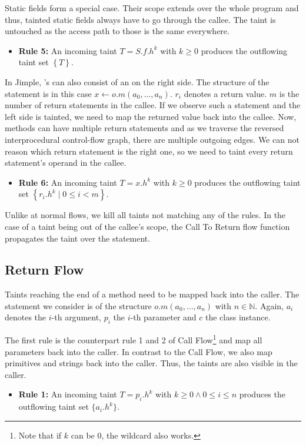 \documentclass[../draft.tex]{subfiles}
\begin{document}
    Static fields form a special case. Their scope extends over the whole program and thus, tainted static fields always have to go through the callee. The taint is untouched as the access path to those is the same everywhere.
    \begin{itemize}
        \item[] \textbf{Rule 5:} An incoming taint $T = S.f.h^k$ with $k \geq 0$ produces the outflowing taint set $\left\{T\right\}$.
    \end{itemize}

    In Jimple, 's can also consist of an  on the right side. The structure of the statement is in this case $x \leftarrow o.m(a_0,...,a_n)$. $r_i$ denotes a return value. $m$ is the number of return statements in the callee. If we observe such a statement and the left side is tainted, we need to map the returned value back into the callee. Now, methods can have multiple return statements and as we traverse the reversed interprocedural control-flow graph, there are multiple outgoing edges. We can not reason which return statement is the right one, so we need to taint every return statement's operand in the callee.
    \begin{itemize}
        \item[] \textbf{Rule 6:} An incoming taint $T = x.h^k$ with $k \geq 0$ produces the outflowing taint set $\left\{r_i.h^k \mid 0 \leq i < m \right\}$. 
    \end{itemize}

    Unlike at normal flows, we kill all taints not matching any of the rules. In the case of a taint being out of the callee's scope, the Call To Return flow function propagates the taint over the statement.

    \subsection{Return Flow}
    Taints reaching the end of a method need to be mapped back into the caller. The statement we consider is of the structure $o.m(a_0, ..., a_n)$ with $n \in \mathbb{N}$. Again, $a_i$ denotes the $i$-th argument, $p_i$ the $i$-th parameter and $c$ the class instance.

    The first rule is the counterpart rule 1 and 2 of Call Flow\footnote{Note that if $k$ can be $0$, the wildcard also works.} and map all parameters back into the caller. In contrast to the Call Flow, we also map primitives and strings back into the caller. Thus, the taints are also visible in the caller.
    \begin{itemize}
        \item[] \textbf{Rule 1:} An incoming taint $T = p_i.h^k$ with $k \geq 0 \land 0 \leq i \leq n$ produces the outflowing taint set $\{a_i.h^k\}$.
    \end{itemize}
\end{document}

